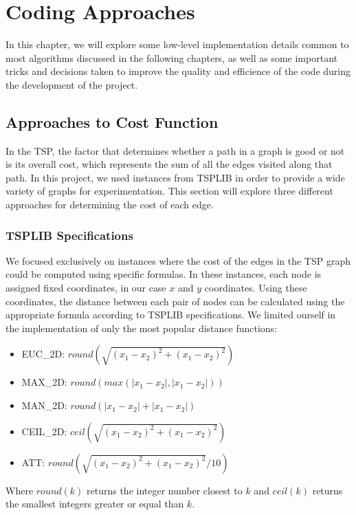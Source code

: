\chapter{Coding Approaches}

In this chapter, we will explore some low-level implementation details common to most algorithms discussed in the following chapters, as well as some important tricks and decisions taken to improve the quality and efficience of the code during the development of the project.

\section{Approaches to Cost Function}

In the TSP, the factor that determines whether a path in a graph is good or not is its overall cost, which represents the sum of all the edges visited along that path.
In this project, we used instances from TSPLIB\cite{tsplib} in order to provide a wide variety of graphs for experimentation.
This section will explore three different approaches for determining the cost of each edge.

\subsection{TSPLIB Specifications}

We focused exclusively on instances where the cost of the edges in the TSP graph could be computed using specific formulas.
In these instances, each node is assigned fixed coordinates, in our case $x$ and $y$ coordinates.
Using these coordinates, the distance between each pair of nodes can be calculated using the appropriate formula according to TSPLIB specifications.
We limited ourself in the implementation of only the most popular distance functions:
\begin{itemize}
    \item EUC\_2D: $round(\sqrt{(x_1 - x_2)^2 + (x_1 - x_2)^2})$
    \item MAX\_2D: $round(max(|x_1 - x_2|,|x_1 - x_2|))$
    \item MAN\_2D: $round(|x_1 - x_2| + |x_1 - x_2|)$
    \item CEIL\_2D: $ceil(\sqrt{(x_1 - x_2)^2 + (x_1 - x_2)^2})$
    \item ATT: \qquad $round(\sqrt{(x_1 - x_2)^2 + (x_1 - x_2)^2}/10)$
\end{itemize}
Where $round(k)$ returns the integer number closest to $k$ and $ceil(k)$ returns the smallest integers greater or equal than $k$.

